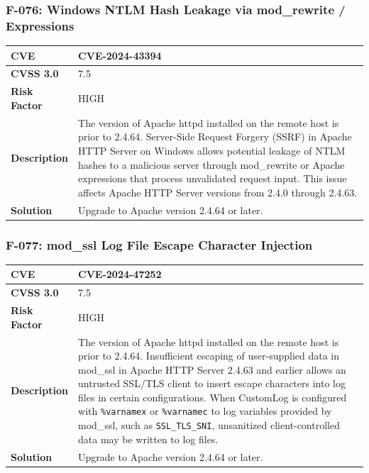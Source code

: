 \subsubsection{F-076: Windows NTLM Hash Leakage via mod\_rewrite / Expressions}
\begin{tabular}{|p{2.8cm}|p{12.2cm}|}
\hline
\textbf{CVE} & CVE-2024-43394 \\ \hline
\textbf{CVSS 3.0} & 7.5 \\ \hline
\textbf{Risk Factor} & HIGH \\ \hline
\textbf{Description} & The version of Apache httpd installed on the remote host is prior to 2.4.64. Server-Side Request Forgery (SSRF) in Apache HTTP Server on Windows allows potential leakage of NTLM hashes to a malicious server through mod\_rewrite or Apache expressions that process unvalidated request input. This issue affects Apache HTTP Server versions from 2.4.0 through 2.4.63. \\ \hline
\textbf{Solution} & Upgrade to Apache version 2.4.64 or later. \\ \hline
\end{tabular}

\subsubsection{F-077: mod\_ssl Log File Escape Character Injection}
\begin{tabular}{|p{2.8cm}|p{12.2cm}|}
\hline
\textbf{CVE} & CVE-2024-47252 \\ \hline
\textbf{CVSS 3.0} & 7.5 \\ \hline
\textbf{Risk Factor} & HIGH \\ \hline
\textbf{Description} & The version of Apache httpd installed on the remote host is prior to 2.4.64. Insufficient escaping of user-supplied data in mod\_ssl in Apache HTTP Server 2.4.63 and earlier allows an untrusted SSL/TLS client to insert escape characters into log files in certain configurations. When CustomLog is configured with \texttt{\%{varname}x} or \texttt{\%{varname}c} to log variables provided by mod\_ssl, such as \texttt{SSL\_TLS\_SNI}, unsanitized client-controlled data may be written to log files. \\ \hline
\textbf{Solution} & Upgrade to Apache version 2.4.64 or later. \\ \hline
\end{tabular}

